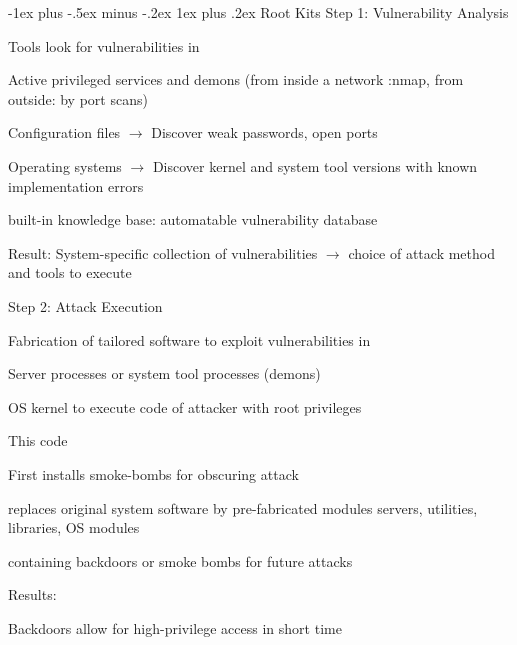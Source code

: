 \documentclass[a4paper]{article}
\makeatletter
\renewcommand{\subsubsection}{\@startsection{subsubsection}{3}{0mm}%
                {-1ex plus -.5ex minus -.2ex}%
                {1ex plus .2ex}%
                {\normalfont\small\bfseries}}
\makeatother
\begin{document}
\begin{multicols}{3}
    \subsubsection{Root Kits}
    Step 1: Vulnerability Analysis
    \begin{itemize*}
        \item Tools look for vulnerabilities in
        \begin{itemize*}
            \item Active privileged services and demons (from inside a network :nmap, from outside: by port scans)
            \item Configuration files $\rightarrow$ Discover weak passwords, open ports
            \item Operating systems $\rightarrow$ Discover kernel and system tool versions with known implementation errors
        \end{itemize*}
        \item built-in knowledge base: automatable vulnerability database
        \item Result: System-specific collection of vulnerabilities $\rightarrow$ choice of attack method and tools to execute
    \end{itemize*}
    Step 2: Attack Execution
    \begin{itemize*}
        \item Fabrication of tailored software to exploit vulnerabilities in
        \begin{itemize*}
            \item Server processes or system tool processes (demons)
            \item OS kernel to execute code of attacker with root privileges
        \end{itemize*}
        \item This code
        \begin{itemize*}
            \item First installs smoke-bombs for obscuring attack
            \item replaces original system software by pre-fabricated modules servers, utilities, libraries, OS modules
            \item containing backdoors or smoke bombs for future attacks
        \end{itemize*}
        \item Results:
        \begin{itemize*}
            \item Backdoors allow for high-privilege access in short time

\end{itemize*}
\end{itemize*}
\end{multicols}
\end{document}
